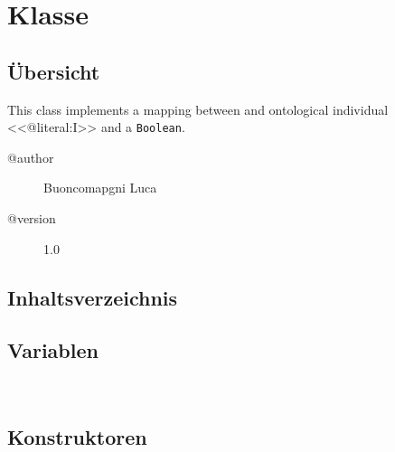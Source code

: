 
\section[BooleanDataMapper]{Klasse }\label{ontologyFramework.OFDataMapping.primitiveDataMapper.BooleanDataMapper-class}
\subsection{Übersicht}
This class implements a mapping between and 
 ontological individual <<@literal:I>> and a \texttt{Boolean}.
\begin{description}
\item[@author] 
Buoncomapgni Luca
\item[@version] 
1.0
\end{description}
\subsection{Inhaltsverzeichnis}
\subsection{Variablen}
\begin{description}
\item[{\label{ontologyFramework.OFDataMapping.primitiveDataMapper.BooleanDataMapper.BOOLEANMAPPING_dataProperty}}]
~ 
\end{description}
\subsection{Konstruktoren}
\begin{description}
\item[{\label{ontologyFramework.OFDataMapping.primitiveDataMapper.BooleanDataMapper()}}]
~ 
\end{description}
